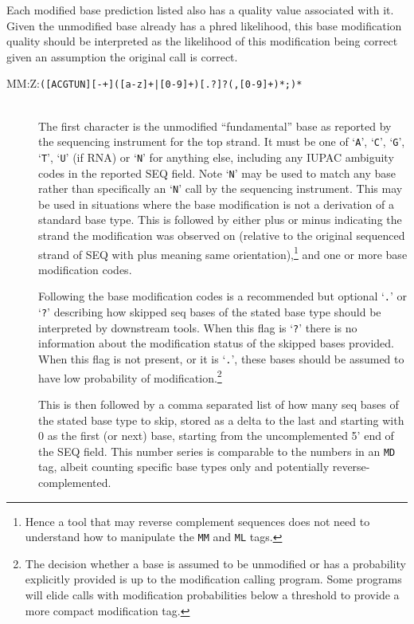 \documentclass[10pt]{article}
\newcommand{\tagregex}[1]{{\tt #1}}
\begin{document}
Each modified base prediction listed also has a quality value associated with it.
Given the unmodified base already has a phred likelihood, this base modification quality should be interpreted as the likelihood of this modification being correct given an assumption the original call is correct.

\begin{description}
\item[MM:Z:\tagregex{([ACGTUN][-+]([a-z]+|[0-9]+)[.?]?(,[0-9]+)*;)*}]
\hfill\\
The first character is the unmodified ``fundamental'' base as reported
by the sequencing instrument for the top strand.
It must be one of `{\tt A}', `{\tt C}', `{\tt G}', `{\tt T}', `{\tt U}' (if RNA) or `{\tt N}' for anything else, including any IUPAC ambiguity codes in the reported SEQ field.
Note `{\tt N}' may be used to match any base rather than specifically an `{\tt N}' call by the sequencing instrument.
This may be used in situations where the base modification is not a derivation of a standard base type.
This is followed by either plus or minus indicating the strand the modification was observed on (relative to the original sequenced strand of {\sf SEQ} with plus meaning same orientation),\footnote{Hence a tool that may reverse complement sequences does not need to understand how to manipulate the {\tt MM} and {\tt ML} tags.} and one or more base modification codes.

Following the base modification codes is a recommended but optional `{\tt .}' or `{\tt ?}' describing how skipped seq bases of the stated base type should be interpreted by downstream tools.
When this flag is `{\tt ?}' there is no information about the modification status of the skipped bases provided.
When this flag is not present, or it is `{\tt .}', these bases should be assumed to have low probability of modification.\footnote{The decision whether a base is assumed to be unmodified or has a probability explicitly provided is up to the modification calling program. Some programs will elide calls with modification probabilities below a threshold to provide a more compact modification tag.}

This is then followed by a comma separated list of how many seq bases of the stated base type to skip, stored as a delta to the last and starting with 0 as the first (or next) base, starting from the uncomplemented 5' end of the {\sf SEQ} field.
This number series is comparable to the numbers in an {\tt MD} tag,
albeit counting specific base types only and potentially reverse-complemented.


\end{description}
\end{document}
